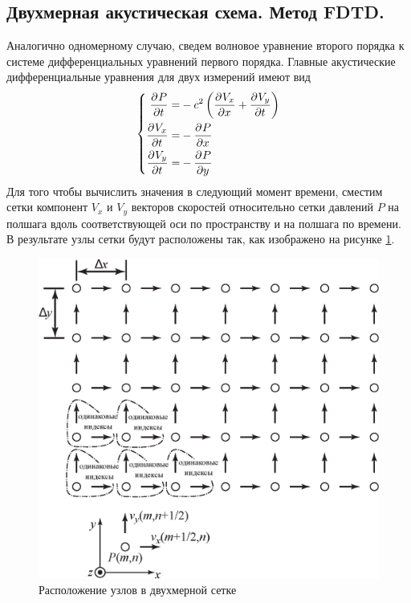 \documentclass[a4paper, fontsize=14pt]{article}
\begin{document}
\subsection{Двухмерная акустическая схема. Метод FDTD.}
Аналогично одномерному случаю, сведем волновое уравнение второго порядка к системе дифференциальных уравнений
первого порядка.
Главные акустические дифференциальные уравнения для двух измерений имеют вид
\begin{equation}
	\left\{
	\begin{aligned}
		\label{acousticGov}
		\frac{\partial ^ {  } P}{\partial t ^ {  } } =& - c^2\left(\frac{\partial ^ {  } V_x}{\partial x ^ {  } }+\frac{\partial ^ {  } V_y}{\partial t ^ {  } }\right)\\
		\frac{\partial ^ {  } V_x}{\partial t ^ {  } } =& - \frac{\partial ^ {  } P}{\partial x ^ {  } }\\
		\frac{\partial ^ {  } V_y}{\partial t ^ {  } } =& - \frac{\partial ^ {  } P}{\partial y ^ {  } }
	\end{aligned}
	\right.
\end{equation}
Для того чтобы вычислить значения в следующий момент времени, сместим сетки компонент $V_x$ и $V_y$
векторов скоростей относительно сетки давлений $P$ на полшага вдоль соответствующей оси по пространству и на полшага
по времени. В результате узлы сетки будут расположены так, как изображено на рисунке \ref{grid2d}.
\begin{figure}[h]
	\centering
	\includegraphics[width=0.75\columnwidth]{acoustic-2d-grid-ru.eps}
	\caption{Расположение узлов в двухмерной сетке}
	\label{grid2d}
\end{figure}
\end{document}
